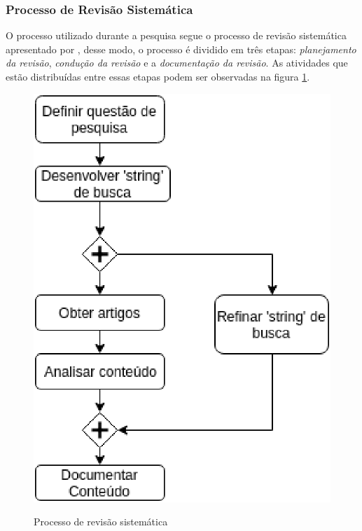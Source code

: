 	 \subsubsection{Processo de Revisão Sistemática}

	 	O processo utilizado durante a pesquisa segue o processo de revisão sistemática apresentado por \cite{Kitchenham}, desse modo, o processo é dividido em três etapas: \textit{planejamento da revisão}, \textit{condução da revisão} e a \textit{documentação da revisão}. As atividades que estão distribuídas entre essas etapas podem ser observadas na figura \ref{img:processo_revisao_sistematica}.

	 	\begin{figure}[H]
			\centering
			\caption{Processo de revisão sistemática}
			\includegraphics[scale=0.8]{figuras/processo_revisao_sistematica.eps}
			\label{img:processo_revisao_sistematica}
		\end{figure}

